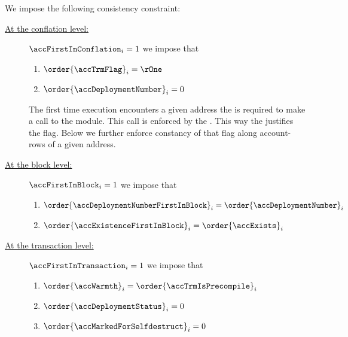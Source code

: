 We impose the following consistency constraint:
\begin{description}
	\item[\underline{At the conflation level:}] \label{hub: consistency: account: trimming first appearance of an address}
		\If $\accFirstInConflation  _{i} = 1$
		\Then we impose that
		\begin{enumerate}
			\item $\order{\accTrmFlag}_{i} = \rOne$
			\item $\order{\accDeploymentNumber}_{i} = 0$
		\end{enumerate}
		\saNote{}
		The first time execution encounters a given address the \zkEvm{} is required to make a call to the \trmMod{} module.
		This call is enforced by the \accTrmFlag{}.
		This way the \zkEvm{} justifies the \accTrmIsPrecompile{} flag.
		Below we further enforce constancy of that flag along account-rows of a given address.
	\item[\underline{At the block level:}]
		\If $\accFirstInBlock _{i} = 1$
		\Then we impose that
		\begin{enumerate}
			\item $\order{\accDeploymentNumberFirstInBlock} _{i} = \order{\accDeploymentNumber} _{i}$
			\item $\order{\accExistenceFirstInBlock}        _{i} = \order{\accExists}           _{i}$
		\end{enumerate}
	\item[\underline{At the transaction level:}]
		\If $\accFirstInTransaction _{i} = 1$
		\Then we impose that
		\begin{enumerate}
			\item $\order{\accWarmth}_{i} = \order{\accTrmIsPrecompile}_{i}$
			\item $\order{\accDeploymentStatus}_{i} = 0$
			\item $\order{\accMarkedForSelfdestruct}_{i} = 0$
		\end{enumerate}
\end{description}
